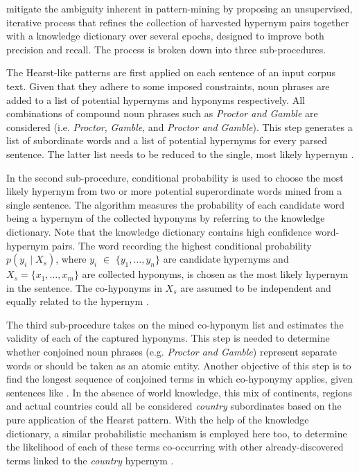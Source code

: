 \citet{Wang2017} mitigate the ambiguity inherent in pattern-mining by proposing an unsupervised, iterative process that refines the collection of harvested hypernym pairs together with a knowledge dictionary over several epochs, designed to improve both precision and recall.  The process is broken down into three sub-procedures.  

The Hearst-like patterns are first applied on each sentence of an input corpus text.  Given that they adhere to some imposed constraints, noun phrases are added to a list of potential hypernyms and hyponyms respectively.  All combinations of compound noun phrases such as \textit{Proctor and Gamble} are considered (i.e. \textit{Proctor}, \textit{Gamble}, and \textit{Proctor and Gamble}).  This step generates a list of subordinate words and a list of potential hypernyms for every parsed sentence.  The latter list needs to be reduced to the single, most likely hypernym \citep{Wang2017}.

In the second sub-procedure, conditional probability is used to choose the most likely hypernym from two or more potential superordinate words mined from a single sentence.  The algorithm measures the probability of each candidate word being a hypernym of the collected hyponyms by referring to the knowledge dictionary.  Note that the knowledge dictionary contains high confidence word-hypernym pairs.  The word recording the highest conditional probability $p(y_i \mid X_s)$, where $y_i$ $\in$ $\{y_1,\ldots,y_n\}$ are candidate hypernyms and $X_s=\{x_1,\ldots, x_m\}$ are collected hyponyms, is chosen as the most likely hypernym in the sentence.  The co-hyponyms in \(X_s\) are assumed to be independent and equally related to the hypernym \citep{wu2012probase}.

The third sub-procedure takes on the mined co-hyponym list and estimates the validity of each of the captured hyponyms.  This step is needed to determine whether conjoined noun phrases (e.g. \textit{Proctor and Gamble}) represent separate words or should be taken as an atomic entity.  Another objective of this step is to find the longest sequence of conjoined terms in which co-hyponymy applies, given sentences like .  In the absence of world knowledge, this mix of continents, regions and actual countries could all be considered \textit{country} subordinates based on the pure application of the Hearst pattern.  With the help of the knowledge dictionary, a similar probabilistic mechanism is employed here too, to determine the likelihood of each of these terms co-occurring with other already-discovered terms linked to the \textit{country} hypernym \citep{wu2012probase}.  

